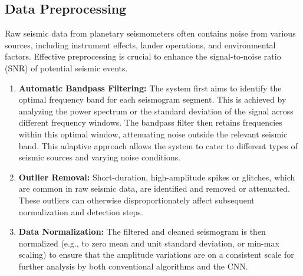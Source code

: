 \documentclass[conference]{IEEEtran}
\begin{document}
\subsection{Data Preprocessing}
Raw seismic data from planetary seismometers often contains noise from various sources, including instrument effects, lander operations, and environmental factors. Effective preprocessing is crucial to enhance the signal-to-noise ratio (SNR) of potential seismic events.
\begin{enumerate}
    \item \textbf{Automatic Bandpass Filtering:} The system first aims to identify the optimal frequency band for each seismogram segment. This is achieved by analyzing the power spectrum or the standard deviation of the signal across different frequency windows. The bandpass filter then retains frequencies within this optimal window, attenuating noise outside the relevant seismic band. This adaptive approach allows the system to cater to different types of seismic sources and varying noise conditions.
    \item \textbf{Outlier Removal:} Short-duration, high-amplitude spikes or glitches, which are common in raw seismic data, are identified and removed or attenuated. These outliers can otherwise disproportionately affect subsequent normalization and detection steps.
    \item \textbf{Data Normalization:} The filtered and cleaned seismogram is then normalized (e.g., to zero mean and unit standard deviation, or min-max scaling) to ensure that the amplitude variations are on a consistent scale for further analysis by both conventional algorithms and the CNN.
\end{enumerate}
\end{document}
